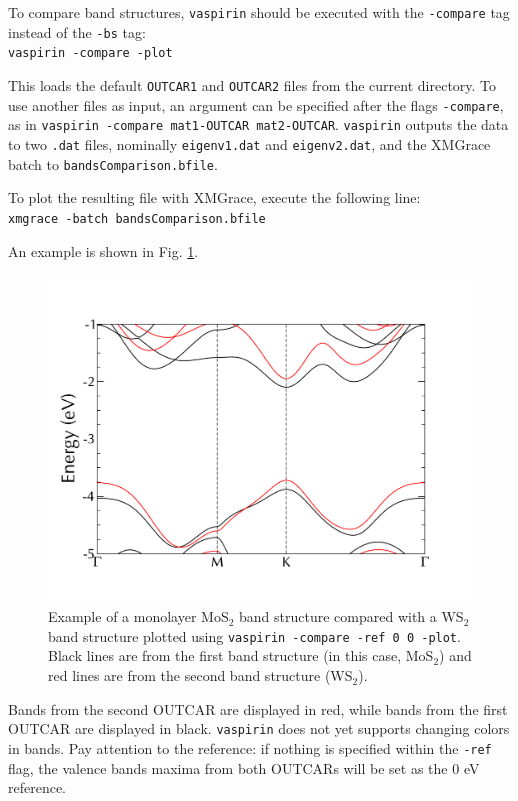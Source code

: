 \documentclass{refart}
\begin{document}
 To compare band structures, \texttt{vaspirin} should be executed with the \texttt{-compare} tag instead of the \texttt{-bs} tag:\\
\texttt{vaspirin -compare -plot}

This loads the default \texttt{OUTCAR1} and \texttt{OUTCAR2} files from the current directory. To use another files as input, an argument can be specified after the flags \texttt{-compare}, as in \texttt{vaspirin -compare mat1-OUTCAR mat2-OUTCAR}. \texttt{vaspirin} outputs the data to two \texttt{.dat} files, nominally \texttt{eigenv1.dat} and \texttt{eigenv2.dat}, and the XMGrace batch to \texttt{bandsComparison.bfile}.

 To plot the resulting file with XMGrace, execute the following line:\\
\texttt{xmgrace -batch bandsComparison.bfile}

An example is shown in Fig. \ref{fig:compare-bs}.

\begin{figure}[h!]
	\centering
	\includegraphics[width=\textwidth]{img/compare-mos2_ws2.pdf}
	\caption{Example of a monolayer MoS$_2$ band structure compared with a WS$_2$ band structure plotted using \texttt{vaspirin -compare -ref 0 0 -plot}. Black lines are from the first band structure (in this case, MoS$_2$) and red lines are from the second band structure (WS$_2$).}
	\label{fig:compare-bs}
\end{figure}

 Bands from the second OUTCAR are displayed in red, while bands from the first OUTCAR are displayed in black. \texttt{vaspirin} does not yet supports changing colors in bands. Pay attention to the reference: if nothing is specified within the \texttt{-ref} flag, the valence bands maxima from both OUTCARs will be set as the 0 eV reference.
\end{document}
